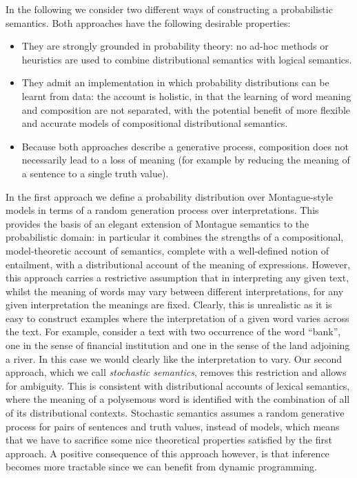 \documentclass[11pt]{article}
\theoremstyle{definition}
\begin{document}
In the following we consider two different ways of constructing a
probabilistic semantics. Both approaches have the following desirable
properties:
\begin{itemize}
\item They are strongly grounded in probability theory: no ad-hoc methods
  or heuristics are used to combine distributional semantics with
  logical semantics.
\item They admit an implementation in which probability distributions
  can be learnt from data: the account is holistic, in that the
  learning of word meaning and composition are not separated, with the
  potential benefit of more flexible and accurate models of
  compositional distributional semantics.
\item Because both approaches describe a generative process,
  composition does not necessarily lead to a loss of meaning (for
  example by reducing the meaning of a sentence to a single truth
  value).
\end{itemize}

In the first approach we define a probability distribution over
Montague-style models in terms of a random generation process over
interpretations. This provides the basis of an elegant extension of
Montague semantics to the probabilistic domain: in particular it
combines the strengths of a compositional, model-theoretic account of
semantics, complete with a well-defined notion of entailment, with a
distributional account of the meaning of expressions.  However, this
approach carries a restrictive assumption that in interpreting any
given text, whilst the meaning of words may vary between different
interpretations, for any given interpretation the meanings are
fixed. Clearly, this is unrealistic as it is easy to construct
examples where the interpretation of a given word varies across the
text. For example, consider a text with two
occurrence of  the word ``bank'', one in the sense of
financial institution and one in the sense of the land adjoining a river.  In this  case we would clearly like
the interpretation to vary. Our second approach, which we call
\emph{stochastic semantics}, removes this restriction and allows for
ambiguity. This is consistent with distributional accounts of lexical
semantics, where the meaning of a polysemous word is identified with
the combination of all of its distributional contexts. Stochastic
semantics assumes a random generative process for pairs of sentences
and truth values, instead of models, which means that we have to
sacrifice some nice theoretical properties satisfied by the first
approach. A positive consequence of this approach however, is that
inference becomes more tractable since we can benefit from dynamic
programming.
\end{document}
